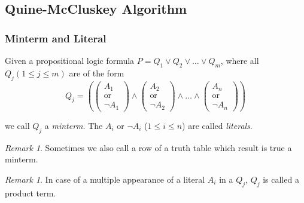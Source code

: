 \documentclass{beamer}
\theoremstyle{remark}
\newtheorem{remark}[theorem]{Remark}
\begin{document}
\subsection{Quine-McCluskey Algorithm}
\begin{frame}
\frametitle{Minterm and Literal}

\begin{definition}
	Given a propositional logic formula $P = Q_1 \lor Q_2 \lor \ldots \lor Q_m$, where all $Q_j (1 \leq j \leq m)$ are of the form
	\[Q_j = \left ( \left ( \begin{matrix}A_1 \\ \text{or} \\ \lnot A_1  \end{matrix} \right ) \land
		\left ( \begin{matrix}A_2 \\ \text{or} \\ \lnot A_2  \end{matrix} \right ) \land \ldots \land
		\left (\begin{matrix}A_n \\ \text{or} \\ \lnot A_n  \end{matrix}\right ) \right ) \]

	
	we call $Q_j$ a {\em minterm}. The $A_i$ or $\lnot A_i$ ($1 \leq i \leq n$) are called {\em literals}.
\end{definition}

\pause

\begin{remark}
Sometimes we also call a row of a truth table which result is true a minterm.
\end{remark}

\pause

\begin{remark}
In case of a multiple appearance of a literal $A_i$ in a $Q_j$, $Q_j$ is called a product term.
\end{remark}
\end{frame}
\end{document}
